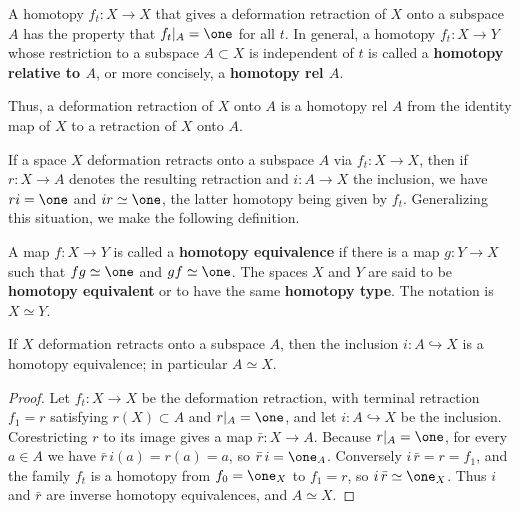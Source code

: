 \begin{definition}
\label{def:homotopy-rel-a}
\leanok
{}
A homotopy $f_t : X \to X$ that gives a deformation retraction of $X$ onto a subspace
$A$ has the property that $f_t|_A = \one$ for all $t$. In general, a homotopy $f_t : X \to Y$
whose restriction to a subspace $A \subset X$ is independent of $t$ is called a
\textbf{homotopy relative to $A$}, or more concisely, a \textbf{homotopy rel $A$}.
\end{definition}

Thus, a deformation retraction of $X$ onto $A$ is a homotopy rel $A$ from the identity
map of $X$ to a retraction of $X$ onto $A$.

If a space $X$ deformation retracts onto a subspace $A$ via $f_t : X \to X$, then if
$r : X \to A$ denotes the resulting retraction and $i : A \to X$ the inclusion, we have
$ri = \one$ and $ir \simeq \one$, the latter homotopy being given by $f_t$. Generalizing this
situation, we make the following definition.

\begin{definition}
\label{def:homotopy-equivalence}
\leanok
{}
A map $f : X \to Y$ is called a \textbf{homotopy equivalence} if there is a map
$g : Y \to X$ such that $fg \simeq \one$ and $gf \simeq \one$. The spaces $X$ and $Y$ are said to
be \textbf{homotopy equivalent} or to have the same \textbf{homotopy type}. The notation is
$X \simeq Y$.
\end{definition}

\begin{proposition}
\label{prop:deformation-retract-homotopy-equivalence}
\leanok
{}
If $X$ deformation retracts onto a subspace $A$, then the inclusion
$i : A \hookrightarrow X$ is a homotopy equivalence; in particular $A \simeq X$.
\end{proposition}

\begin{proof}
\leanok
{}
Let $f_t : X \to X$ be the deformation retraction, with terminal retraction
$f_1 = r$ satisfying $r(X) \subset A$ and $r|_A = \one$, and let $i : A \hookrightarrow X$
be the inclusion. Corestricting $r$ to its image gives a map $\bar r : X \to A$.
Because $r|_A = \one$, for every $a \in A$ we have $\bar r\, i(a) = r(a) = a$, so
$\bar r\, i = \one_A$. Conversely $i\, \bar r = r = f_1$, and the family $f_t$ is a
homotopy from $f_0 = \one_X$ to $f_1 = r$, so $i\, \bar r \simeq \one_X$. Thus $i$
and $\bar r$ are inverse homotopy equivalences, and $A \simeq X$.
\end{proof}

